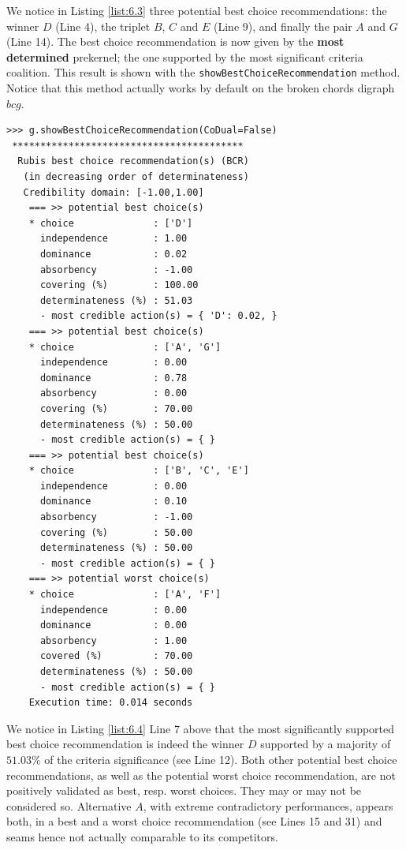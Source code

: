 We notice in Listing \ref{list:6.3} three potential best choice recommendations: the \Condorcet winner $D$ (Line 4), the triplet $B$, $C$ and $E$ (Line 9), and finally the pair $A$ and $G$ (Line 14). The best choice recommendation is now given by the \textbf{most determined} prekernel; the one supported by the most significant criteria coalition. This result is shown with the \texttt{showBestChoiceRecommendation} method. Notice that this method actually works by default on the broken chords digraph $bcg$.

\begin{lstlisting}[caption={Computing a best choice recommendation},label=list:6.4]
>>> g.showBestChoiceRecommendation(CoDual=False)
 *****************************************
  Rubis best choice recommendation(s) (BCR)
   (in decreasing order of determinateness)   
   Credibility domain: [-1.00,1.00]
    === >> potential best choice(s)
    * choice              : ['D']
      independence        : 1.00
      dominance           : 0.02
      absorbency          : -1.00
      covering (%)        : 100.00
      determinateness (%) : 51.03
      - most credible action(s) = { 'D': 0.02, }
    === >> potential best choice(s)
    * choice              : ['A', 'G']
      independence        : 0.00
      dominance           : 0.78
      absorbency          : 0.00
      covering (%)        : 70.00
      determinateness (%) : 50.00
      - most credible action(s) = { }
    === >> potential best choice(s)
    * choice              : ['B', 'C', 'E']
      independence        : 0.00
      dominance           : 0.10
      absorbency          : -1.00
      covering (%)        : 50.00
      determinateness (%) : 50.00
      - most credible action(s) = { }
    === >> potential worst choice(s) 
    * choice              : ['A', 'F']
      independence        : 0.00
      dominance           : 0.00
      absorbency          : 1.00
      covered (%)         : 70.00
      determinateness (%) : 50.00
      - most credible action(s) = { }
    Execution time: 0.014 seconds
\end{lstlisting}

We notice in Listing \ref{list:6.4} Line 7 above that the most significantly supported best choice recommendation is indeed the \Condorcet winner $D$ supported by a majority of $51.03\%$ of the criteria significance (see Line 12). Both other potential best choice recommendations, as well as the potential worst choice recommendation, are not positively validated as best, resp. worst choices. They may or may not be considered so. Alternative $A$, with extreme contradictory performances, appears both, in a best and a worst choice recommendation (see Lines 15 and 31) and seams hence not actually comparable to its competitors.


